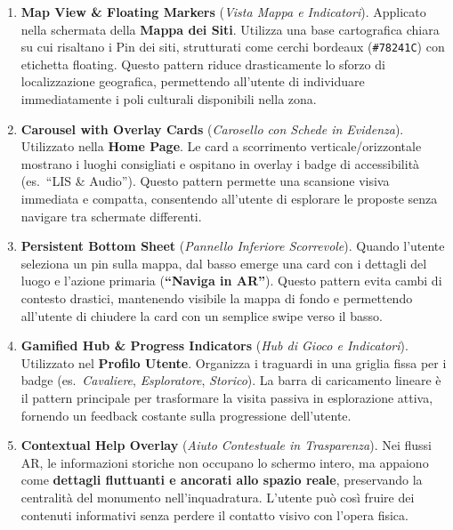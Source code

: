 \begin{enumerate}[leftmargin=1.6em]

    \item \textbf{Map View \& Floating Markers} (\textit{Vista Mappa e Indicatori}).
    Applicato nella schermata della \textbf{Mappa dei Siti}. Utilizza una base cartografica chiara su cui risaltano i Pin dei siti, strutturati come cerchi bordeaux (\texttt{\#78241C}) con etichetta floating. Questo pattern riduce drasticamente lo sforzo di localizzazione geografica, permettendo all'utente di individuare immediatamente i poli culturali disponibili nella zona.

    \item \textbf{Carousel with Overlay Cards} (\textit{Carosello con Schede in Evidenza}).
    Utilizzato nella \textbf{Home Page}. Le card a scorrimento verticale/orizzontale mostrano i luoghi consigliati e ospitano in overlay i badge di accessibilità (es.\ ``LIS \& Audio''). Questo pattern permette una scansione visiva immediata e compatta, consentendo all'utente di esplorare le proposte senza navigare tra schermate differenti.

    \item \textbf{Persistent Bottom Sheet} (\textit{Pannello Inferiore Scorrevole}).
    Quando l'utente seleziona un pin sulla mappa, dal basso emerge una card con i dettagli del luogo e l'azione primaria (\textbf{``Naviga in AR''}). Questo pattern evita cambi di contesto drastici, mantenendo visibile la mappa di fondo e permettendo all'utente di chiudere la card con un semplice swipe verso il basso.

    \item \textbf{Gamified Hub \& Progress Indicators} (\textit{Hub di Gioco e Indicatori}).
    Utilizzato nel \textbf{Profilo Utente}. Organizza i traguardi in una griglia fissa per i badge (es.\ \textit{Cavaliere}, \textit{Esploratore}, \textit{Storico}). La barra di caricamento lineare è il pattern principale per trasformare la visita passiva in esplorazione attiva, fornendo un feedback costante sulla progressione dell'utente.

    \item \textbf{Contextual Help Overlay} (\textit{Aiuto Contestuale in Trasparenza}).
    Nei flussi AR, le informazioni storiche non occupano lo schermo intero, ma appaiono come \textbf{dettagli fluttuanti e ancorati allo spazio reale}, preservando la centralità del monumento nell'inquadratura. L'utente può così fruire dei contenuti informativi senza perdere il contatto visivo con l'opera fisica.

\end{enumerate}

